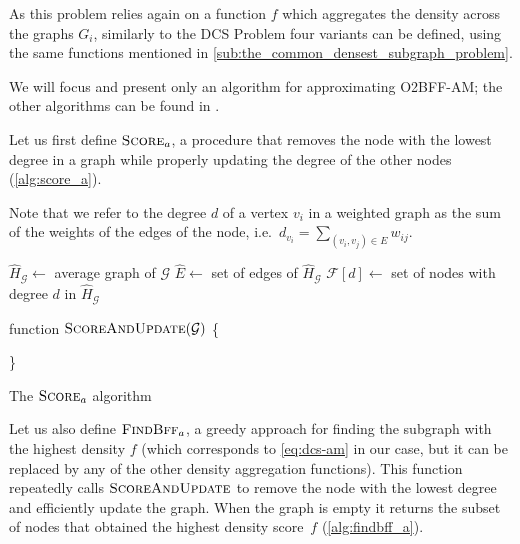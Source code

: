 As this problem relies again on a function $f$ which aggregates the density
across the graphs $G_i$, similarly to the \acrshort{DCS} Problem four variants
can be defined, using the same functions mentioned in
\autoref{sub:the_common_densest_subgraph_problem}.

We will focus and present only an algorithm for approximating
\acrshort{O2BFF}-AM; the other algorithms can be found in
\cite{semertzidis2019finding}.

Let us first define $\textsc{Score}_{a}  $, a procedure that removes the node
with the lowest degree in a graph while properly updating the degree of the
other nodes (\autoref{alg:score_a}).

Note that we refer to the degree $d$ of a vertex $v_{i} $ in a weighted graph as
the sum of the weights of the edges of the node, i.e.\ $ d_{v_i} = \sum^{}_{(v_{i} , v_{j}
	) \in E} w_{ij}  $.

\begin{algorithm}
	\SetAlgoLined
	$\hat{H}_{\mathcal{G} } \leftarrow $ average graph of $\mathcal{G} $ \;
	$\hat{E} \leftarrow $ set of edges of $\hat{H}_{\mathcal{G} }  $ \;
	$\mathcal{F}[d] \leftarrow $ set of nodes with degree
	$d$ in $\hat{H}_{\mathcal{G} }  $\;

	\bigskip

	{function \textnormal{$\textsc{ScoreAndUpdate}( \mathcal{G} )$ \{ }}
	{}

	\}
	\caption{The $\textsc{Score}_{a}  $ algorithm}
	\label{alg:score_a}
\end{algorithm}

Let us also define $\textsc{FindBff}_{a} $, a greedy approach for finding
the subgraph with the highest density $f$ (which corresponds to
\eqref{eq:dcs-am} in our case, but it can be replaced by any of the other
density aggregation functions). This function repeatedly calls
$\textsc{ScoreAndUpdate}$ to remove the node with the lowest degree and
efficiently update
the graph. When the graph is empty it returns the subset of nodes
that obtained the highest density score~$f$ (\autoref{alg:findbff_a}).

